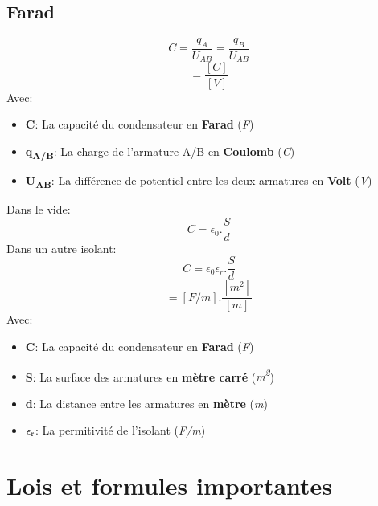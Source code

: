  \subsection{Farad}

 \begin{equation}
	 C = \frac{q_{A}}{U_{AB}} =\frac{q_{B}}{U_{AB}}
 \end{equation}
 \begin{equation}
	 [F] = \frac{[C]}{[V]}
 \end{equation}
 Avec:
 \begin{itemize}
	 \item \textbf{C}: La capacité du condensateur en \textbf{Farad} (\textit{F})
	 \item \textbf{q\textsubscript{A/B}}: La charge de l'armature A/B en \textbf{Coulomb} (\textit{C})
	 \item \textbf{U\textsubscript{AB}}: La différence de potentiel entre les deux armatures en \textbf{Volt} (\textit{V})
 \end{itemize}

 Dans le vide:
 \begin{equation}
	 C = \epsilon_{0}.\frac{S}{d}
 \end{equation}
 Dans un autre isolant:
 \begin{equation}
	 C = \epsilon_{0}\epsilon_{r}.\frac{S}{d}
 \end{equation}
 \begin{equation}
	 [F] = [F/m].\frac{[m^2]}{[m]}
 \end{equation}
 Avec:
 \begin{itemize}
	 \item \textbf{C}: La capacité du condensateur en \textbf{Farad} (\textit{F})
	 \item \textbf{S}: La surface des armatures en \textbf{mètre carré} (\textit{m\textsuperscript{2}})
	 \item \textbf{d}: La distance entre les armatures en \textbf{mètre} (\textit{m})
	 \item \textbf{$\epsilon\textsubscript{r}$}: La permitivité de l'isolant (\textit{F/m})

 \end{itemize}



 \section{Lois et formules importantes}

